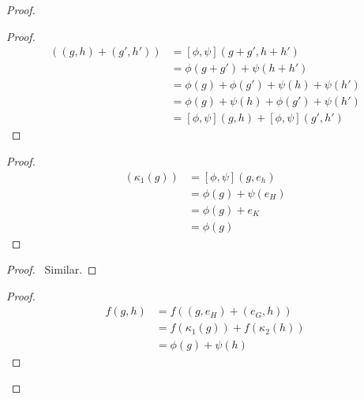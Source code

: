 \documentclass{book}
\let\qed\relax
\theoremstyle{definition}
\begin{document}
\begin{proof}
    \pf
    \begin{proof}
        \pf
        \begin{align*}
            [\phi,\psi]((g,h) + (g',h')) & = [\phi,\psi](g + g', h + h') \\
            & = \phi(g + g') + \psi(h + h') \\
            & = \phi(g) + \phi(g') + \psi(h) + \psi(h') \\
            & = \phi(g) + \psi(h) + \phi(g') + \psi(h') \\
            & = [\phi,\psi](g,h) + [\phi,\psi](g',h')
        \end{align*}
    \end{proof}
    \begin{proof}
        \pf
        \begin{align*}
            [\phi,\psi](\kappa_1(g)) & = [\phi,\psi](g,e_h) \\
            & = \phi(g) + \psi(e_H) \\
            & = \phi(g) + e_K \\
            & = \phi(g)
        \end{align*}
    \end{proof}
    \begin{proof}
        \pf\ Similar.
    \end{proof}
    \begin{proof}
        \pf
        \begin{align*}
            f(g,h) & = f((g,e_H) + (e_G,h)) \\
            & = f(\kappa_1(g)) + f(\kappa_2(h)) \\
            & = \phi(g) + \psi(h)
        \end{align*}
    \end{proof}
    \qed
\end{proof}
\end{document}
